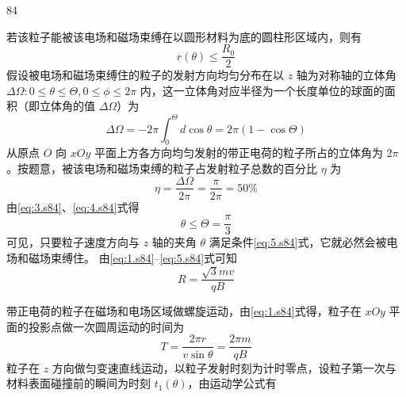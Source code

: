 \begin{solution}{84}
\begin{subsolution}
\begin{subsubsolution}
            若该粒子能被该电场和磁场束缚在以圆形材料为底的圆柱形区域内，则有
            \begin{equation}
                r(\theta) \leq \frac{R_{0}}{2}
                \label{eq:2.s84}
            \end{equation}
            假设被电场和磁场束缚住的粒子的发射方向均匀分布在以 $z$ 轴为对称轴的立体角 $\Delta\Omega: 0\leq\theta\leq\Theta, 0\leq\phi\leq 2\pi$ 内，这一立体角对应半径为一个长度单位的球面的面积（即立体角的值 $\Delta\Omega$）为
            \begin{equation}
                \Delta\Omega = -2\pi \int_{0}^{\Theta} d\cos\theta = 2\pi(1-\cos\Theta)
                \label{eq:3.s84}
            \end{equation}
            从原点 $O$ 向 $xOy$ 平面上方各方向均匀发射的带正电荷的粒子所占的立体角为 $2\pi$。按题意，被该电场和磁场束缚的粒子占发射粒子总数的百分比 $\eta$ 为
            \begin{equation}
                \eta = \frac{\Delta\Omega}{2\pi} = \frac{\pi}{2\pi} = 50\%
                \label{eq:4.s84}
            \end{equation}
            由\eqref{eq:3.s84}、\eqref{eq:4.s84}式得
            \begin{equation}
                \theta \leq \Theta = \frac{\pi}{3}
                \label{eq:5.s84}
            \end{equation}
            可见，只要粒子速度方向与 $z$ 轴的夹角 $\theta$ 满足条件\eqref{eq:5.s84}式，它就必然会被电场和磁场束缚住。
            由\eqref{eq:1.s84}--\eqref{eq:5.s84}式可知
            \begin{equation}
                R = \frac{\sqrt{3} m v}{q B}
                \label{eq:6.s84}
            \end{equation}
        \end{subsubsolution}
        \begin{subsubsolution}
            \begin{subsubsubsolution}
                \begin{subsubsubsubsolution}
                    带正电荷的粒子在磁场和电场区域做螺旋运动，由\eqref{eq:1.s84}式得，粒子在 $xOy$ 平面的投影点做一次圆周运动的时间为
                    \begin{equation}
                        T = \frac{2\pi r}{v\sin\theta} = \frac{2\pi m}{q B}
                        \label{eq:7.s84}
                    \end{equation}
                    粒子在 $z$ 方向做匀变速直线运动，以粒子发射时刻为计时零点，设粒子第一次与材料表面碰撞前的瞬间为时刻 $t_{1}(\theta)$，由运动学公式有

\end{subsubsubsubsolution}
\end{subsubsubsolution}
\end{subsubsolution}
\end{subsolution}
\end{solution}
